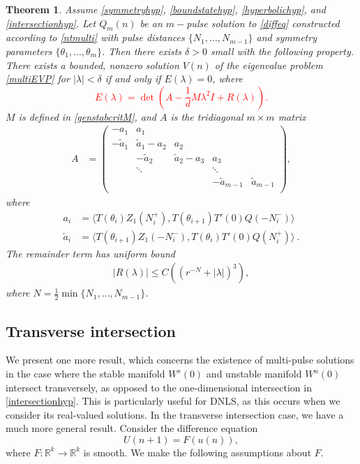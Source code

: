 \documentclass[12pt]{elsarticle}
\def\R{{\mathbb R}}
\newtheorem{theorem}{Theorem}
\newcommand{\revised}[1]{ \textcolor{red}{#1} }
\begin{document}
\begin{theorem}\label{stabilitytheorem}
Assume \cref{symmetryhyp}, \cref{boundstatehyp}, \cref{hyperbolichyp}, and \cref{intersectionhyp}. Let $Q_m(n)$ be an $m-$pulse solution to \cref{diffeq} constructed according to \cref{ntmulti} with pulse distances $\{ N_1, \dots, N_{m-1}\}$ and symmetry parameters $\{\theta_1, \dots, \theta_m\}$. Then there exists $\delta > 0$ small with the following property. There exists a bounded, nonzero solution $V(n)$ of the eigenvalue problem \cref{multiEVP} for $|\lambda| < \delta$ if and only if $E(\lambda) = 0$, where
\revised{
\begin{equation}\label{Elambda}
E(\lambda) = \det\left(A - \frac{1}{d}M \lambda^2 I + R(\lambda)\right).
\end{equation}
}
$M$ is defined in \eqref{genstabcritM}, and $A$ is the tridiagonal $m \times m$ matrix
\begin{align}\label{matrixA}
A &= \begin{pmatrix}
-a_1 & a_1 & & & \\
-\tilde{a}_1 & \tilde{a}_1 - a_2 & a_2 \\
& -\tilde{a}_2 & \tilde{a}_2 - a_3 & a_3 \\
& \ddots & & \ddots \\
& & & -\tilde{a}_{m-1} & \tilde{a}_{m-1}  \\
\end{pmatrix},
\end{align}
where
\begin{align*}
a_i &= \langle T(\theta_i) Z_1(N_i^+), T(\theta_{i+1}) T'(0)Q(-N_i^-) \rangle \\
\tilde{a}_i &= \langle T(\theta_{i+1}) Z_1(-N_i^-), T(\theta_i) T'(0)Q(N_i^+) \rangle \:.
\end{align*}
The remainder term has uniform bound
\begin{align}\label{Rbound2}
|R(\lambda)| \leq C\left( (r^{-N} + |\lambda|)^3 \right),
\end{align}
where $N = \frac{1}{2}\min\{N_1, \dots, N_{m-1} \}$.
\end{theorem}

\subsection{Transverse intersection}

We present one more result, which concerns the existence of multi-pulse solutions in the case where the stable manifold $W^s(0)$ and unstable manifold $W^u(0)$ intersect transversely, as opposed to the one-dimensional intersection in \cref{intersectionhyp}. This is particularly useful for DNLS, as this occurs when we consider its real-valued solutions. In the transverse intersection case, we have a much more general result. Consider the difference equation
\begin{equation}\label{diffeqtransv}
U(n+1) = F(u(n)),
\end{equation}
where $F: \R^k \rightarrow \R^k$ is smooth. We make the following assumptions about $F$.
\end{document}
